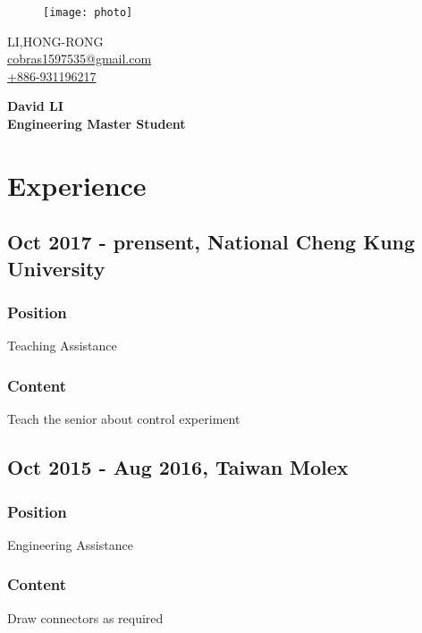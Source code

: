 \documentclass[a4paper,12pt,final]{memoir}
\newcommand{\SmallSep}{\vspace{0.5em}}
\begin{document}
\begin{figure}
	\hfill
	\texttt{[image: photo]}
	\vspace{-7cm}
\end{figure}

\begin{flushright}\small
	LI,HONG-RONG \\
	\url{cobras1597535@gmail.com}  \\
	\url{+886-931196217}
\end{flushright}\normalsize
\framebreak


\Huge\bfseries {\color{RoyalBlue} David LI} \\
\Large\bfseries  Engineering Master Student \\

\normalsize\normalfont



\section{Experience}

\subsection{Oct 2017 - prensent, National Cheng Kung University}
\subsubsection{Position}
Teaching Assistance
\subsubsection{Content}
Teach the senior about control experiment

\subsection{Oct 2015 - Aug 2016, Taiwan Molex}
\subsubsection{Position}
Engineering Assistance
\subsubsection{Content}
Draw connectors as required
\end{document}
